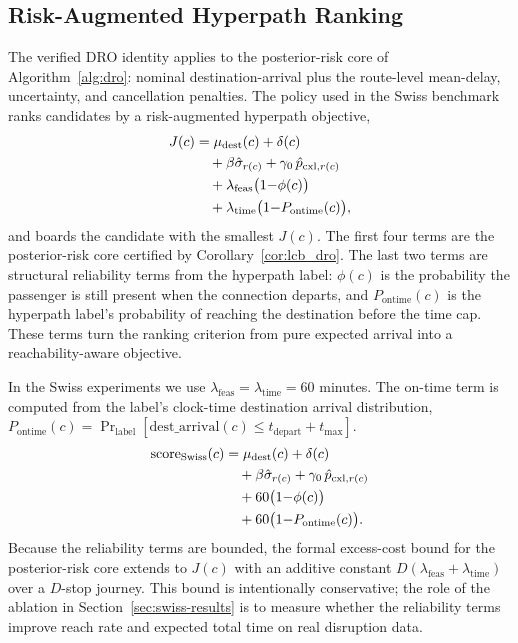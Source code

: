 \documentclass[opre,dblanonrev]{informs4}
\begin{document}
\subsection{Risk-Augmented Hyperpath Ranking}
\label{sec:method-layered-score}

The verified DRO identity applies to the posterior-risk core of
Algorithm~\ref{alg:dro}: nominal destination-arrival plus the
route-level mean-delay, uncertainty, and cancellation penalties. The
policy used in the Swiss benchmark ranks candidates by a
risk-augmented hyperpath objective,
\begin{align}
\label{eq:risk-objective}
J(c)
&= \mu_{\mathrm{dest}}(c) + \delta(c) \notag\\
&\quad + \beta\hat\sigma_{r(c)}
  + \gamma_0\,\hat p_{\mathrm{cxl},r(c)} \notag\\
&\quad + \lambda_{\mathrm{feas}}\bigl(1{-}\phi(c)\bigr) \notag\\
&\quad + \lambda_{\mathrm{time}}\bigl(1{-}P_{\mathrm{ontime}}(c)\bigr),
\end{align}
and boards the candidate with the smallest $J(c)$. The first four
terms are the posterior-risk core certified by
Corollary~\ref{cor:lcb_dro}. The last two terms are structural
reliability terms from the hyperpath label: $\phi(c)$ is the
probability the passenger is still present when the connection
departs, and $P_{\mathrm{ontime}}(c)$ is the hyperpath label's
probability of reaching the destination before the time cap. These
terms turn the ranking criterion from pure expected arrival into a
reachability-aware objective.

In the Swiss experiments we use
$\lambda_{\mathrm{feas}}=\lambda_{\mathrm{time}}=60$ minutes. The
on-time term is computed from the label's clock-time destination
arrival distribution,
$P_{\text{ontime}}(c)=\Pr_{\text{label}}[\mathrm{dest\_arrival}(c)
\leq t_{\mathrm{depart}}+t_{\max}]$.
\begin{align}
\label{eq:swiss-risk-score}
\mathrm{score}_{\mathrm{Swiss}}(c)
&= \mu_{\mathrm{dest}}(c) + \delta(c) \notag\\
&\quad + \beta\hat\sigma_{r(c)}
  + \gamma_0\,\hat p_{\mathrm{cxl},r(c)} \notag\\
&\quad + 60\bigl(1{-}\phi(c)\bigr) \notag\\
&\quad + 60\bigl(1{-}P_{\mathrm{ontime}}(c)\bigr).
\end{align}
Because the reliability terms are bounded, the formal excess-cost
bound for the posterior-risk core extends to $J(c)$ with an additive
constant $D(\lambda_{\mathrm{feas}}+\lambda_{\mathrm{time}})$ over a
$D$-stop journey. This bound is intentionally conservative; the
role of the ablation in Section~\ref{sec:swiss-results} is to
measure whether the reliability terms improve reach rate and
expected total time on real disruption data.
\end{document}
